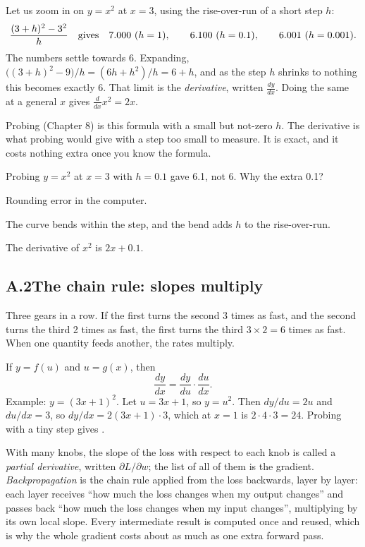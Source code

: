 Let us zoom in on $y=x^2$ at $x=3$, using the rise-over-run of a short step $h$:
\[
\frac{(3+h)^2 - 3^2}{h}\quad\text{gives}\quad 7.000\ (h=1),\qquad 6.100\ (h=0.1),\qquad
6.001\ (h=0.001).
\]
The numbers settle towards 6. \Exactly Expanding, $\big((3+h)^2-9\big)/h = (6h+h^2)/h = 6+h$, and as the
step $h$ shrinks to nothing this becomes exactly 6. That limit is the \emph{derivative}, written
$\frac{dy}{dx}$. Doing the same at a general $x$ gives $\frac{d}{dx}x^2 = 2x$.

\Why Probing (Chapter 8) is this formula with a small but not-zero $h$. The derivative is what probing would
give with a step too small to measure. It is exact, and it costs nothing extra once you know the formula.

\begin{checkq}
Probing $y=x^2$ at $x=3$ with $h=0.1$ gave 6.1, not 6. Why the extra 0.1?
\begin{options}
\item Rounding error in the computer.
\item The curve bends within the step, and the bend adds $h$ to the rise-over-run.
\item The derivative of $x^2$ is $2x+0.1$.
\end{options}
\end{checkq}

\subsection*{A.2\quad The chain rule: slopes multiply}

\Picture Three gears in a row. If the first turns the second 3 times as fast, and the second turns the third
2 times as fast, the first turns the third $3\times2=6$ times as fast. When one quantity feeds another, the
rates multiply.

\Exactly If $y=f(u)$ and $u=g(x)$, then
\[
\frac{dy}{dx}=\frac{dy}{du}\cdot\frac{du}{dx}.
\]
Example: $y=(3x+1)^2$. Let $u=3x+1$, so $y=u^2$. Then $dy/du=2u$ and $du/dx=3$, so $dy/dx = 2(3x+1)\cdot3$,
which at $x=1$ is $2\cdot4\cdot3 = 24$. Probing with a tiny step gives \nAppAChainNum.

With many knobs, the slope of the loss with respect to each knob is called a \emph{partial derivative},
written $\partial L/\partial w$; the list of all of them is the gradient. \emph{Backpropagation} is the chain
rule applied from the loss backwards, layer by layer: each layer receives ``how much the loss changes when my
output changes'' and passes back ``how much the loss changes when my input changes'', multiplying by its own
local slope. Every intermediate result is computed once and reused, which is why the whole gradient costs
about as much as one extra forward pass.

